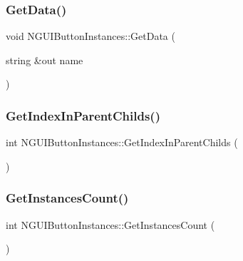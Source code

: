 \subsubsection{\texorpdfstring{Get\+Data()}{GetData()}}
{\footnotesize\ttfamily void N\+G\+U\+I\+Button\+Instances\+::\+Get\+Data (\begin{DoxyParamCaption}\item[{string \&out}]{name }\end{DoxyParamCaption})}

\hypertarget{class_n_g_u_i_button_instances_a48dbd1713d7606c928140ab95d66df50}{}\label{class_n_g_u_i_button_instances_a48dbd1713d7606c928140ab95d66df50} 
\subsubsection{\texorpdfstring{Get\+Index\+In\+Parent\+Childs()}{GetIndexInParentChilds()}}
{\footnotesize\ttfamily int N\+G\+U\+I\+Button\+Instances\+::\+Get\+Index\+In\+Parent\+Childs (\begin{DoxyParamCaption}{ }\end{DoxyParamCaption})}

\hypertarget{class_n_g_u_i_button_instances_a99b5e04d788190058738d388133c1d63}{}\label{class_n_g_u_i_button_instances_a99b5e04d788190058738d388133c1d63} 
\subsubsection{\texorpdfstring{Get\+Instances\+Count()}{GetInstancesCount()}}
{\footnotesize\ttfamily int N\+G\+U\+I\+Button\+Instances\+::\+Get\+Instances\+Count (\begin{DoxyParamCaption}{ }\end{DoxyParamCaption})}

\hypertarget{class_n_g_u_i_button_instances_aef6dd4712e37b52b933e0cea8b0fe5c0}{}\label{class_n_g_u_i_button_instances_aef6dd4712e37b52b933e0cea8b0fe5c0} 

